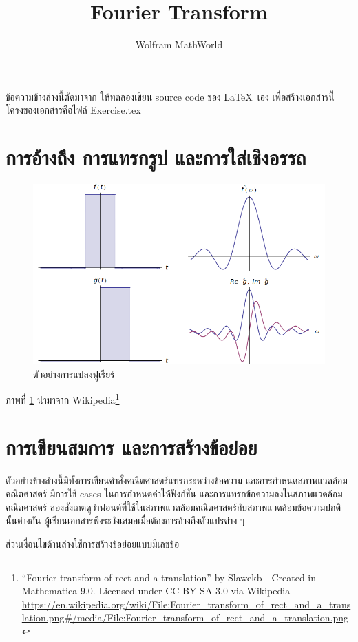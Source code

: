 \documentclass[a4paper,12pt]{article}
\title{Fourier Transform}
\author{Wolfram MathWorld}
\date{}
\begin{document}
\maketitle
ข้อความข้างล่างนี้ตัดมาจาก \cite{WolframForier} ให้ทดลองเขียน source code ของ \LaTeX~เอง เพื่อสร้างเอกสารนี้ โครงของเอกสารคือไฟล์ Exercise.tex

\section{การอ้างถึง การแทรกรูป และการใส่เชิงอรรถ}
\begin{figure}[h]
\centering
\includegraphics[width=.8\columnwidth]{ExercisesFig/Fourier_transform_of_rect_and_a_translation}
\caption{ตัวอย่างการแปลงฟูเรียร์}
\label{Fig:TransformExample}
\end{figure}
ภาพที่ \ref{Fig:TransformExample} นำมาจาก Wikipedia\footnote{``Fourier transform of rect and a translation'' by Slawekb - Created in Mathematica 9.0. Licensed under CC BY-SA 3.0 via Wikipedia - \url{https://en.wikipedia.org/wiki/File:Fourier_transform_of_rect_and_a_translation.png#/media/File:Fourier_transform_of_rect_and_a_translation.png}}

\section{การเขียนสมการ และการสร้างข้อย่อย}
ตัวอย่างข้างล่างนี้มีทั้งการเขียนคำสั่งคณิตศาสตร์แทรกระหว่างข้อความ และการกำหนดสภาพแวดล้อมคณิตศาสตร์ มีการใช้ cases ในการกำหนดค่าให้ฟังก์ชัน และการแทรกข้อความลงในสภาพแวดล้อมคณิตศาสตร์ ลองสังเกตดูว่าฟอนต์ที่ใช้ในสภาพแวดล้อมคณิตศาสตร์กับสภาพแวดล้อมข้อความปกตินั้นต่างกัน ผู้เขียนเอกสารพึงระวังเสมอเมื่อต้องการอ้างถึงตัวแปรต่าง ๆ

ส่วนเงื่อนไขด้านล่างใช้การสร้างข้อย่อยแบบมีเลขข้อ
\end{document}
